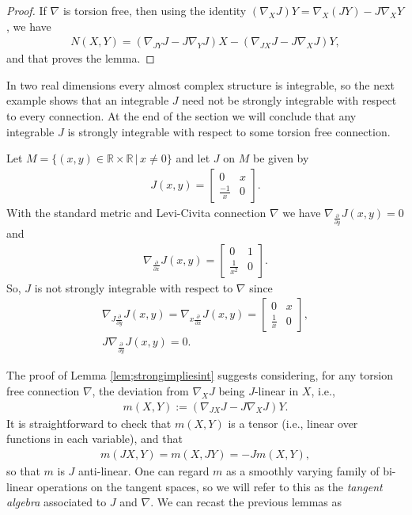 \documentclass[11pt]{article}
\numberwithin{equation}{section}
\newcommand{\R}{\mathbb{R}}
\begin{document}
\begin{proof}
If $\nabla$ is torsion free, then using the identity $(\nabla_X J) Y = \nabla_X (J Y) - J \nabla_X Y$, we have
\begin{gather}
N(X,Y) = (\nabla_{JY} J - J \nabla_Y J) X - (\nabla_{JX} J - J \nabla_X J)Y, \label{eq:Nnabla}
\end{gather}
and that proves the lemma.
\end{proof}

In two real dimensions every almost complex structure is integrable, so the next example shows that an integrable $J$ need not be strongly integrable with respect to every connection. At the end of the section we will conclude that any integrable $J$ is strongly integrable with respect to some torsion free connection.

\begin{ex} \label{ex;2dex}Let $M = \{ (x,y) \in \R \times \R\, | \, x \neq 0 \}$ and let
$J$ on $M$ be given by
\begin{gather*}
J(x,y) =
\begin{bmatrix}
0 & x \\
\frac {-1}{ x} & 0
\end{bmatrix}.
\end{gather*}
With the standard metric and Levi-Civita connection $\nabla$ we have $\nabla_{\frac{\partial }{\partial y}} J(x,y) = 0$
and
\begin{gather*}
\nabla_{\frac{\partial }{\partial x}} J(x,y) =
\begin{bmatrix}
0 & 1 \\
\frac{1}{ x^2} & 0
\end{bmatrix}.
\end{gather*}
So, $J$ is not strongly integrable with respect to $\nabla$ since
\begin{gather*}
 \nabla_{ J \frac{\partial }{\partial y}} J(x,y)= \nabla_{x \frac{\partial }{\partial x}} J(x,y) =
\begin{bmatrix}
0 & x \\
\frac{1}{ x} & 0
\end{bmatrix}, \\
J \nabla_{\frac{\partial }{\partial y}} J(x,y)= 0 .
\end{gather*}
\end{ex}

The proof of Lemma \ref{lem;strongimpliesint} suggests considering, for any torsion free connection $\nabla$, the deviation from $\nabla_X J$ being $J$-linear in $X$, i.e.,
\begin{gather} \label{eq:tanalg}
m(X,Y) := ( \nabla_{JX} J - J \nabla_X J ) Y.
\end{gather}
It is straightforward to check that $m(X,Y)$ is a tensor (i.e., linear over functions in each variable), and that
\begin{gather} \label{eq:misJantilinear}
m(JX,Y) = m(X,JY) = - J m(X,Y),
\end{gather}
so that $m$ is $J$ anti-linear. One can regard $m$ as a smoothly varying family of bi-linear operations on the tangent spaces, so we will refer to this as the \emph{tangent algebra} associated to $J$ and $\nabla$.
We can recast the previous lemmas as
\end{document}
